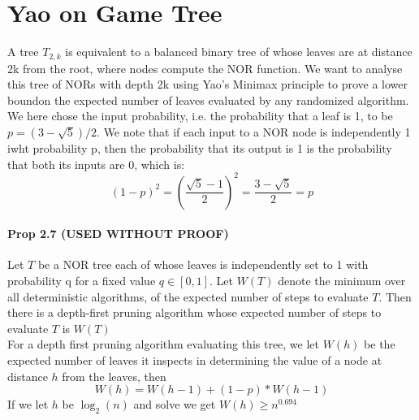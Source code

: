 \documentclass[a4paper, fleqn]{article}
\begin{document}
\section{Yao on Game Tree}
A tree $T_{2,k}$ is equivalent to a balanced binary tree of whose leaves are at distance 2k from the root, where nodes compute the NOR function.
We want to analyse this tree of NORs with depth 2k using Yao's Minimax principle to prove a lower boundon the expected number of leaves evaluated by any randomized algorithm.
We here chose the input probability, i.e. the probability that a leaf is 1, to be $p = (3 - \sqrt{5})/2$. We note that if each input to a NOR node is independently 1 iwht probability p, then the probability that its output is 1 is the probability that both its inputs are 0, which is:
$$
(1 - p)^2 = \left(\frac{\sqrt 5 - 1}{2} \right)^2 = \frac{3-\sqrt{5}}{2} = p
$$
\paragraph{Prop 2.7 (USED WITHOUT PROOF)} Let $T$ be a NOR tree each of whose leaves is independently set to 1 with probability q for a fixed value $q \in [0,1]$. Let $W(T)$ denote the minimum over all deterministic algorithms, of the expected number of steps to evaluate $T$. Then there is a depth-first pruning algorithm whose expected number of steps to evaluate $T$ is $W(T)$\\
For a depth first pruning algorithm evaluating this tree, we let $W(h)$ be the expected number of leaves it inspects in determining the value of a node at distance $h$ from the leaves, then
$$
W(h) = W(h-1) + (1-p) * W(h-1)
$$
If we let $h$ be $\log_2(n)$ and solve we get $W(h) \geq n^{0.694}$
\end{document}
